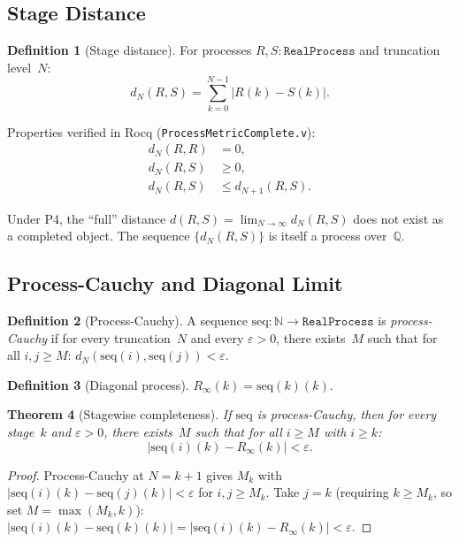 \documentclass[11pt,a4paper]{article}
\newtheorem{theorem}{Theorem}[section]
\theoremstyle{definition}
\newtheorem{definition}[theorem]{Definition}
\theoremstyle{remark}
\newcommand{\RP}{\texttt{RealProcess}}
\begin{document}
\subsection{Stage Distance}

\begin{definition}[Stage distance]
For processes $R, S : \RP$ and truncation level~$N$:
\[
  d_N(R, S) = \sum_{k=0}^{N-1} |R(k) - S(k)|.
\]
\end{definition}

Properties verified in Rocq (\texttt{ProcessMetricComplete.v}):
\begin{align}
  d_N(R, R) &= 0, \label{eq:self}\\
  d_N(R, S) &\ge 0, \label{eq:nonneg}\\
  d_N(R, S) &\le d_{N+1}(R, S). \label{eq:mono}
\end{align}

Under P4, the ``full'' distance $d(R, S) = \lim_{N \to \infty} d_N(R, S)$ does not exist as a completed object.  The sequence $\{d_N(R, S)\}$ is itself a process over~$\mathbb{Q}$.

\subsection{Process-Cauchy and Diagonal Limit}

\begin{definition}[Process-Cauchy]
A sequence $\mathrm{seq} : \mathbb{N} \to \RP$ is \emph{process-Cauchy} if for every truncation~$N$ and every $\varepsilon > 0$, there exists~$M$ such that for all $i, j \ge M$:
$d_N(\mathrm{seq}(i), \mathrm{seq}(j)) < \varepsilon$.
\end{definition}

\begin{definition}[Diagonal process]
$R_\infty(k) = \mathrm{seq}(k)(k)$.
\end{definition}

\begin{theorem}[Stagewise completeness]\label{thm:completeness}
If $\mathrm{seq}$ is process-Cauchy, then for every stage~$k$ and $\varepsilon > 0$, there exists~$M$ such that for all $i \ge M$ with $i \ge k$:
\[
  |\mathrm{seq}(i)(k) - R_\infty(k)| < \varepsilon.
\]
\end{theorem}

\begin{proof}
Process-Cauchy at $N = k{+}1$ gives $M_k$ with $|\mathrm{seq}(i)(k) - \mathrm{seq}(j)(k)| < \varepsilon$ for $i, j \ge M_k$.  Take $j = k$ (requiring $k \ge M_k$, so set $M = \max(M_k, k)$):
$|\mathrm{seq}(i)(k) - \mathrm{seq}(k)(k)| = |\mathrm{seq}(i)(k) - R_\infty(k)| < \varepsilon$. \qedhere
\end{proof}
\end{document}
